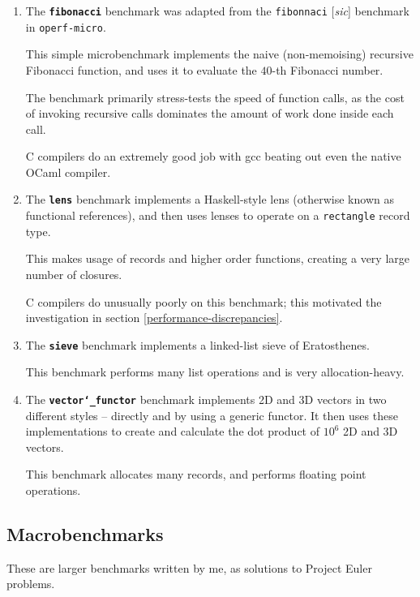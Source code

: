 \documentclass[12pt,a4paper,twoside,openright]{report}
\begin{document}
\begin{enumerate}

  \item
    The \textbf{\texttt{fibonacci}} benchmark was adapted from the \lstinline!fibonnaci!
[\textit{sic}] benchmark in \lstinline!operf-micro!.

This simple microbenchmark implements the naive (non-memoising) recursive
Fibonacci function, and uses it to evaluate the $40$-th Fibonacci number.

The benchmark primarily stress-tests the speed of function calls, as the cost
of invoking recursive calls dominates the amount of work done inside each call.

C compilers do an extremely good job with gcc beating out even the native OCaml compiler.

\item

  The \textbf{\texttt{lens}} benchmark implements a Haskell-style lens (otherwise known as
functional references), and then uses lenses to operate on a
\lstinline!rectangle! record type.

This makes usage of records and higher order functions, creating a very large
number of closures.

C compilers do unusually poorly on this benchmark; this motivated the
investigation in section \ref{performance-discrepancies}.

\item

  The \textbf{\texttt{sieve}} benchmark implements a linked-list sieve of Eratosthenes.

This benchmark performs many list operations and is very allocation-heavy.

\item

  The \textbf{\texttt{vector\char`_functor}} benchmark implements 2D and 3D vectors in two
different styles -- directly and by using a generic functor. It then uses these
implementations to create and calculate the dot product of $10^6$ 2D and 3D
vectors.

This benchmark allocates many records, and performs floating point operations.
\end{enumerate}

\subsection{Macrobenchmarks}
These are larger benchmarks written by me, as solutions to Project Euler problems.
\end{document}
